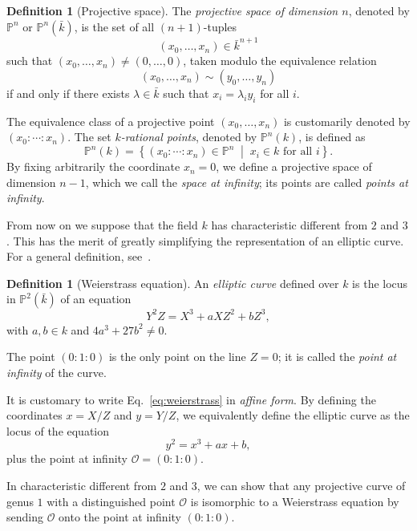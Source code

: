 \documentclass[10pt]{article}
\theoremstyle{plain}
\theoremstyle{definition}
\newtheorem{definition}[theorem]{Definition}
\def\P{\ensuremath{\mathbb{P}}}
\def\O{\ensuremath{\mathcal{O}}}
\begin{document}
\begin{definition}[Projective space]
  The \emph{projective space of dimension $n$}, denoted by $\P^n$ or
  $\P^n(\bar{k})$, is the set of all $(n+1)$-tuples
  \[(x_0,\dots,x_n) ∈ \bar{k}^{n+1}\] %
  such that $(x_0,\dots,x_n) ≠ (0,\dots,0)$, taken modulo the
  equivalence relation
  \[(x_0,\dots,x_n) \sim (y_0,\dots,y_n)\] %
  if and only if there exists $λ\in\bar{k}$ such that
  $x_i=λ_iy_i$ for all $i$.
\end{definition}

The equivalence class of a projective point $(x_0,\dots,x_n)$ is
customarily denoted by $(x_0:\cdots:x_n)$. %
The set \emph{$k$-rational points}, denoted by $\P^n(k)$, is defined
as
\[\P^n(k) = \left\{(x_0:\cdots:x_n)∈\P^n\;\middle|\; x_i ∈ k \text{ for all $i$}\right\}.\] %
By fixing arbitrarily the coordinate $x_n=0$, we define a projective
space of dimension $n-1$, which we call the \emph{space at infinity};
its points are called \emph{points at infinity}.

From now on we suppose that the field $k$ has characteristic different
from $2$ and $3$. %
This has the merit of greatly simplifying the representation of an
elliptic curve. %
For a general definition, see~\cite[Chap.~III]{silverman:elliptic}.

\begin{definition}[Weierstrass equation]
  An \emph{elliptic curve} defined over $k$ is the locus in
  $\P^2(\bar{k})$ of an equation
  \begin{equation}
    \label{eq:weierstrass}
    Y^2Z = X^3 + aXZ^2 + bZ^3,    
  \end{equation}
  with $a,b∈k$ and $4a^3+27b^2\ne0$.

  The point $(0:1:0)$ is the only point on the line $Z=0$; it is
  called the \emph{point at infinity} of the curve.
\end{definition}

It is customary to write Eq.~\eqref{eq:weierstrass} in \emph{affine
  form}. %
By defining the coordinates $x=X/Z$ and $y=Y/Z$, we equivalently
define the elliptic curve as the locus of the equation
\[y^2 = x^3 + ax +b,\]
plus the point at infinity $\O=(0:1:0)$.

In characteristic different from $2$ and $3$, we can show that any
projective curve of genus $1$ with a distinguished point $\O$ is
isomorphic to a Weierstrass equation by sending $\O$ onto the point at
infinity $(0:1:0)$.
\end{document}
